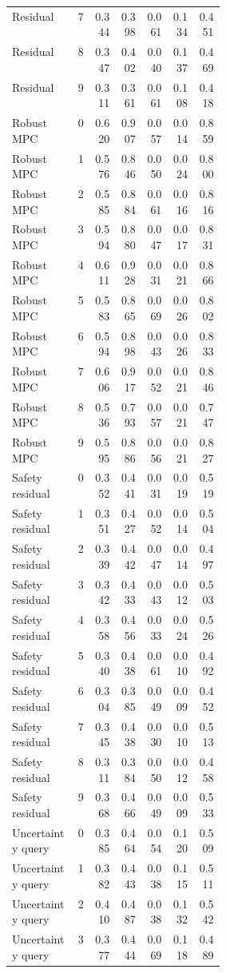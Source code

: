 \documentclass{article}
\begin{document}
\begin{center}
\begin{longtable}{p{0.31\linewidth}rrrrrr}
Residual & 7 & 0.344 & 0.398 & 0.061 & 0.134 & 0.451\\
Residual & 8 & 0.347 & 0.402 & 0.040 & 0.137 & 0.469\\
Residual & 9 & 0.311 & 0.361 & 0.061 & 0.108 & 0.418\\
Robust MPC & 0 & 0.620 & 0.907 & 0.057 & 0.014 & 0.859\\
Robust MPC & 1 & 0.576 & 0.846 & 0.050 & 0.024 & 0.800\\
Robust MPC & 2 & 0.585 & 0.884 & 0.061 & 0.016 & 0.816\\
Robust MPC & 3 & 0.594 & 0.880 & 0.047 & 0.017 & 0.831\\
Robust MPC & 4 & 0.611 & 0.928 & 0.031 & 0.021 & 0.866\\
Robust MPC & 5 & 0.583 & 0.865 & 0.069 & 0.026 & 0.802\\
Robust MPC & 6 & 0.594 & 0.898 & 0.043 & 0.026 & 0.833\\
Robust MPC & 7 & 0.606 & 0.917 & 0.052 & 0.021 & 0.846\\
Robust MPC & 8 & 0.536 & 0.793 & 0.057 & 0.021 & 0.747\\
Robust MPC & 9 & 0.595 & 0.886 & 0.056 & 0.021 & 0.827\\
Safety residual & 0 & 0.352 & 0.441 & 0.031 & 0.019 & 0.519\\
Safety residual & 1 & 0.351 & 0.427 & 0.052 & 0.014 & 0.504\\
Safety residual & 2 & 0.339 & 0.442 & 0.047 & 0.014 & 0.497\\
Safety residual & 3 & 0.342 & 0.433 & 0.043 & 0.012 & 0.503\\
Safety residual & 4 & 0.358 & 0.456 & 0.033 & 0.024 & 0.526\\
Safety residual & 5 & 0.340 & 0.438 & 0.061 & 0.010 & 0.492\\
Safety residual & 6 & 0.304 & 0.385 & 0.049 & 0.009 & 0.452\\
Safety residual & 7 & 0.345 & 0.438 & 0.030 & 0.010 & 0.513\\
Safety residual & 8 & 0.311 & 0.384 & 0.050 & 0.012 & 0.458\\
Safety residual & 9 & 0.368 & 0.466 & 0.049 & 0.009 & 0.533\\
Uncertainty query & 0 & 0.385 & 0.464 & 0.054 & 0.120 & 0.509\\
Uncertainty query & 1 & 0.382 & 0.443 & 0.038 & 0.115 & 0.511\\
Uncertainty query & 2 & 0.410 & 0.487 & 0.038 & 0.132 & 0.542\\
Uncertainty query & 3 & 0.377 & 0.444 & 0.069 & 0.118 & 0.489\\

\end{longtable}
\end{center}
\end{document}
